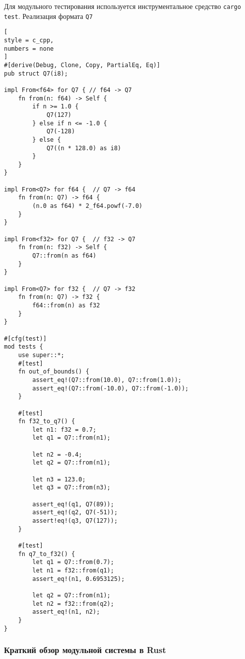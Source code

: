 \documentclass[%
	11pt,
	a4paper,
	utf8,
		]{article}
\begin{document}
Для модульного тестирования используется инструментальное средство \verb|cargo test|. Реализация формата \verb|Q7|
\begin{lstlisting}[
style = c_cpp,
numbers = none
]
#[derive(Debug, Clone, Copy, PartialEq, Eq)]
pub struct Q7(i8);

impl From<f64> for Q7 { // f64 -> Q7
    fn from(n: f64) -> Self {
        if n >= 1.0 {
            Q7(127)
        } else if n <= -1.0 {
            Q7(-128)
        } else {
            Q7((n * 128.0) as i8)
        }
    }
}

impl From<Q7> for f64 {  // Q7 -> f64
    fn from(n: Q7) -> f64 {
        (n.0 as f64) * 2_f64.powf(-7.0)
    }
}

impl From<f32> for Q7 {  // f32 -> Q7
    fn from(n: f32) -> Self {
        Q7::from(n as f64)
    }
}

impl From<Q7> for f32 {  // Q7 -> f32
    fn from(n: Q7) -> f32 {
        f64::from(n) as f32
    }
}

#[cfg(test)]
mod tests {
    use super::*;
    #[test]
    fn out_of_bounds() {
        assert_eq!(Q7::from(10.0), Q7::from(1.0));
        assert_eq!(Q7::from(-10.0), Q7::from(-1.0));
    }

    #[test]
    fn f32_to_q7() {
        let n1: f32 = 0.7;
        let q1 = Q7::from(n1);
        
        let n2 = -0.4;
        let q2 = Q7::from(n1);
        
        let n3 = 123.0;
        let q3 = Q7::from(n3);
        
        assert_eq!(q1, Q7(89));
        assert_eq!(q2, Q7(-51));
        assert!eq!(q3, Q7(127));
    }

    #[test]
    fn q7_to_f32() {
        let q1 = Q7::from(0.7);
        let n1 = f32::from(q1);
        assert_eq!(n1, 0.6953125);
        
        let q2 = Q7::from(n1);
        let n2 = f32::from(q2);
        assert_eq!(n1, n2);
    }
}
\end{lstlisting}

\subsubsection{Краткий обзор модульной системы в Rust}
\end{document}
